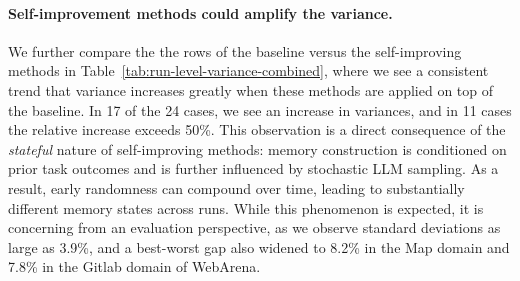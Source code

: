 \documentclass{article}
\begin{document}
\paragraph{Self-improvement methods could amplify the variance.} We further compare the the rows of the baseline versus the self-improving methods in Table~\ref{tab:run-level-variance-combined}, where we see a consistent trend that variance increases greatly when these methods are applied on top of the baseline. In 17 of the 24 cases, we see an increase in variances, and in 11 cases the relative increase exceeds 50\%.
This observation is a direct consequence of the \textit{stateful} nature of self-improving methods: memory construction is conditioned on prior task outcomes and is further influenced by stochastic LLM sampling. As a result, early randomness can compound over time, leading to substantially different memory states across runs. While this phenomenon is expected, it is concerning from an evaluation perspective, as we observe standard deviations as large as 3.9\%, and a best-worst gap also widened to 8.2\% in the Map domain and 7.8\% in the Gitlab domain of WebArena. 
\end{document}
